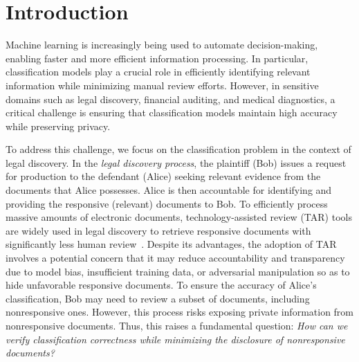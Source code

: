 \section{Introduction}

Machine learning is increasingly being used to automate decision-making, enabling faster and more efficient information processing. 
In particular, classification models play a crucial role in efficiently identifying relevant information while minimizing manual review efforts.
However, in sensitive domains such as legal discovery, financial auditing, and medical diagnostics, a critical challenge is ensuring that classification models maintain high accuracy while preserving privacy.

To address this challenge, we focus on the classification problem in the context of legal discovery.
In the \emph{legal discovery process}, the plaintiff (Bob) issues a request for production to the defendant (Alice) seeking relevant evidence from the documents that Alice possesses. 
Alice is then accountable for identifying and providing the responsive (relevant) documents to Bob. 
To efficiently process massive amounts of electronic documents, technology-assisted review (TAR) tools are widely used in legal discovery to retrieve responsive documents with significantly less human review~\citep{grossman2010technology}. 
Despite its advantages, the adoption of TAR involves a potential concern that it may reduce accountability and transparency due to model bias, insufficient training data, or adversarial manipulation so as to hide unfavorable responsive documents.
To ensure the accuracy of Alice's classification, Bob may need to review a subset of documents, including nonresponsive ones. However, this process risks exposing private information from nonresponsive documents.
Thus, this raises a fundamental question: 
\emph{How can we verify classification correctness while minimizing the disclosure of nonresponsive documents?}


